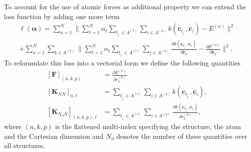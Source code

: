 To account for the use of atomic forces as additional property we can extend the loss function by adding one more term
\begin{multline}
  \label{eq:loss_forces}
 \ell(\boldsymbol{\alpha}) = 
                      \sum_{n=1}^N \| 
                      \sum_{t=1}^N \alpha_t \sum_{t_{i^\prime}\in A^{(t)}} \sum_{i\in A^{(n)}} k(\mathbf{c}_{t_{i^\prime}}, \mathbf{c}_{i}) - E^{(n)}\|^2 \\
                         + \sum_{n=1}^N\sum_{k\in A^{(n)}} \| 
                            \sum_{t=1}^N \alpha_t \sum_{t_{i^\prime}\in A^{(t)}}\sum_{i\in A^{(n)}} \frac{\partial k(\mathbf{c}_{t_{i^\prime}}, \mathbf{c}_{i})}{\partial\mathbf{r}_k}
                            - \frac{\partial E^{(n)}}{\partial\mathbf{r}_{k}}
                        \|^2.
\end{multline}
To reformulate this loss into a vectorial form we define the following quantities
\begin{subequations}
  \begin{align}
    [\mathbf{F}]_{(n,k,p)} &= \frac{\partial E^{(n)}}{\partial r^{(p)}_k} \\
    [\mathbf{K}_{NN}]_{n,t} &= 
      \sum_{t_{i^\prime}\in A^{(t)}}\sum_{i\in A^{(n)}} k(\mathbf{c}_{t_{i^\prime}}, \mathbf{c}_{i}), \\
    [\mathbf{K}_{N_{\partial}N}]_{(n,k,p),t} &= 
      \sum_{t_{i^\prime}\in A^{(t)}}\sum_{i\in A^{(n)}} \frac{\partial k(\mathbf{c}_{t_{i^\prime}}, \mathbf{c}_{i})}{\partial r_k^{(p)}},
  \end{align}
\end{subequations}
where $(n,k,p)$ is the flattened multi-index specifying the structure, the atom and the Cartesian dimension and $N_{\partial}$ denotes the number of these quantities over all structures.
